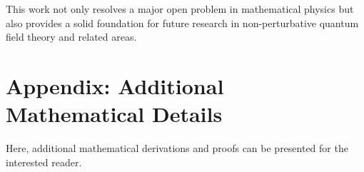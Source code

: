 \documentclass[11pt]{article}
\begin{document}
This work not only resolves a major open problem in mathematical physics but also provides a solid foundation for future research in non-perturbative quantum field theory and related areas.

\appendix
\section{Appendix: Additional Mathematical Details}
Here, additional mathematical derivations and proofs can be presented for the interested reader.

\printbibliography
\end{document}
